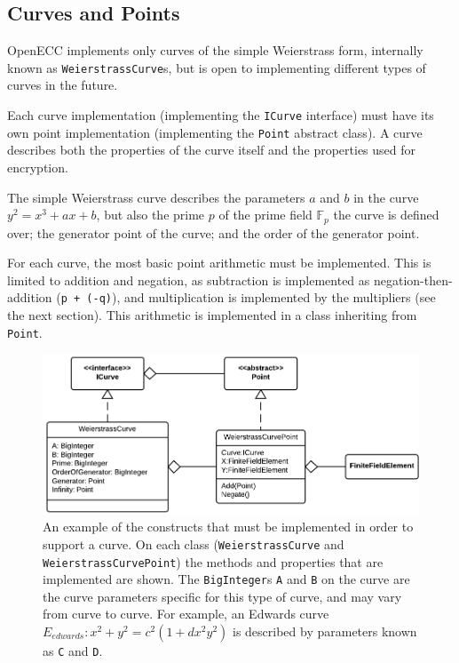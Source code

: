\subsection{Curves and Points}
\label{sec:implementation_curves}

OpenECC implements only curves of the simple Weierstrass form, internally known as \verb+WeierstrassCurve+s,
but is open to implementing different types of curves in the future.

Each curve implementation (implementing the \verb+ICurve+ interface) must have its own point implementation
(implementing the \verb+Point+ abstract class). A curve describes both the properties of the curve itself and
the properties used for encryption.

The simple Weierstrass curve describes the parameters \(a\) and \(b\) in the curve \(y^2 = x^3 + ax + b\), but
also the prime \(p\) of the prime field \(\mathbb{F}_p\) the curve is defined over; the generator point of the
curve; and the order of the generator point.

For each curve, the most basic point arithmetic must be implemented. This is limited to addition and negation, as
subtraction is implemented as negation-then-addition (\verb|p + (-q)|), and multiplication is implemented by the
multipliers (see the next section). This arithmetic is implemented in a class inheriting from \verb+Point+.

\begin{figure}[htb]
	\centering
	\includegraphics[width=1\textwidth]{implementation/curves}
	\caption{An example of the constructs that must be implemented in order to support a curve. On each class
		(\texttt{WeierstrassCurve} and \texttt{WeierstrassCurvePoint}) the methods and properties
		that are implemented are shown. The \texttt{BigInteger}s \texttt{A} and \texttt{B} on the curve are
		the curve parameters specific for this type of curve, and may vary from curve to curve. For example,
		an Edwards curve \(E_{edwards} : x^2 + y^2 = c^2 (1 + dx^2 y^2)\) is described by parameters known as
        \texttt{C} and \texttt{D}.}
\end{figure}

